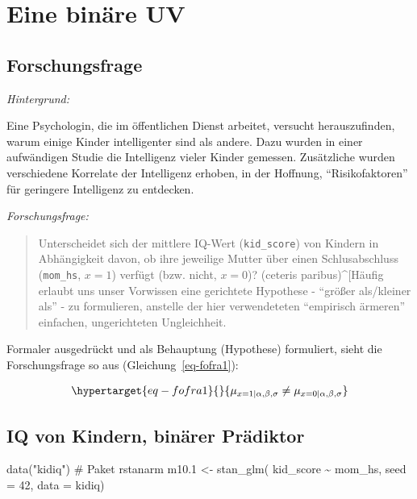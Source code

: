 \documentclass[
  a4paper,
  DIV=11]{scrreprt}
\newenvironment{Shaded}{\begin{snugshade}}{\end{snugshade}}
\newcommand{\AttributeTok}[1]{\textcolor[rgb]{0.40,0.45,0.13}{#1}}
\newcommand{\CommentTok}[1]{\textcolor[rgb]{0.37,0.37,0.37}{#1}}
\newcommand{\DecValTok}[1]{\textcolor[rgb]{0.68,0.00,0.00}{#1}}
\newcommand{\FloatTok}[1]{\textcolor[rgb]{0.68,0.00,0.00}{#1}}
\newcommand{\FunctionTok}[1]{\textcolor[rgb]{0.28,0.35,0.67}{#1}}
\newcommand{\NormalTok}[1]{\textcolor[rgb]{0.00,0.23,0.31}{#1}}
\newcommand{\OtherTok}[1]{\textcolor[rgb]{0.00,0.23,0.31}{#1}}
\newcommand{\SpecialCharTok}[1]{\textcolor[rgb]{0.37,0.37,0.37}{#1}}
\newcommand{\StringTok}[1]{\textcolor[rgb]{0.13,0.47,0.30}{#1}}
\theoremstyle{definition}
\theoremstyle{remark}
\begin{document}
\hypertarget{eine-binuxe4re-uv}{%
\section{Eine binäre UV}\label{eine-binuxe4re-uv}}

\hypertarget{forschungsfrage}{%
\subsection{Forschungsfrage}\label{forschungsfrage}}

\emph{Hintergrund:}

Eine Psychologin, die im öffentlichen Dienst arbeitet, versucht
herauszufinden, warum einige Kinder intelligenter sind als andere. Dazu
wurden in einer aufwändigen Studie die Intelligenz vieler Kinder
gemessen. Zusätzliche wurden verschiedene Korrelate der Intelligenz
erhoben, in der Hoffnung, ``Risikofaktoren'' für geringere Intelligenz
zu entdecken.

\emph{Forschungsfrage:}

\begin{quote}
Unterscheidet sich der mittlere IQ-Wert (\texttt{kid\_score}) von
Kindern in Abhängigkeit davon, ob ihre jeweilige Mutter über einen
Schlusabschluss (\texttt{mom\_hs}, \(x=1\)) verfügt (bzw. nicht,
\(x=0\))? (ceteris paribus)\^{}{[}Häufig erlaubt uns unser Vorwissen
eine gerichtete Hypothese - ``größer als/kleiner als'' - zu formulieren,
anstelle der hier verwendeteten ``empirisch ärmeren'' einfachen,
ungerichteten Ungleichheit.
\end{quote}

Formaler ausgedrückt und als Behauptung (Hypothese) formuliert, sieht
die Forschungsfrage so aus (Gleichung~\ref{eq-fofra1}):

\begin{equation}\protect\hypertarget{eq-fofra1}{}{\mu_{x=1|\alpha, \beta, \sigma} \ne \mu_{x=0|\alpha, \beta, \sigma}}\label{eq-fofra1}\end{equation}

\hypertarget{iq-von-kindern-binuxe4rer-pruxe4diktor}{%
\subsection{IQ von Kindern, binärer
Prädiktor}\label{iq-von-kindern-binuxe4rer-pruxe4diktor}}

\begin{Shaded}
\begin{Highlighting}[]
\FunctionTok{data}\NormalTok{(}\StringTok{"kidiq"}\NormalTok{)  }\CommentTok{\# Paket rstanarm}
\NormalTok{m10}\FloatTok{.1} \OtherTok{\textless{}{-}} \FunctionTok{stan\_glm}\NormalTok{(}
\NormalTok{  kid\_score }\SpecialCharTok{\textasciitilde{}}\NormalTok{ mom\_hs, }
  \AttributeTok{seed =} \DecValTok{42}\NormalTok{,}
  \AttributeTok{data =}\NormalTok{ kidiq)}
\end{Highlighting}
\end{Shaded}
\end{document}
